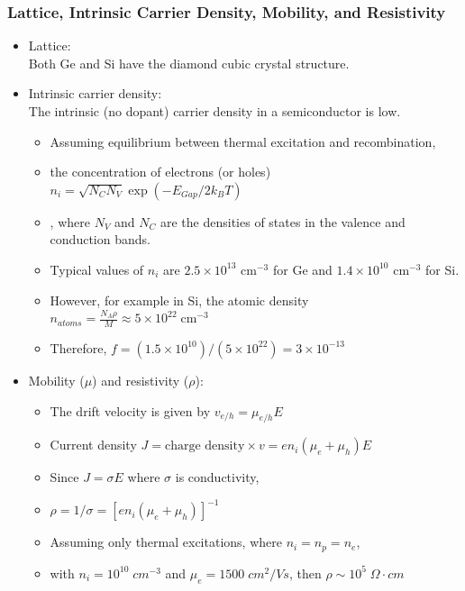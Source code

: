 \subsubsection{Lattice, Intrinsic Carrier Density,  Mobility, and Resistivity}
\begin{itemize}
    \item Lattice:\\
    Both Ge and Si have the diamond cubic crystal structure.
    \item Intrinsic carrier density:\\
    The intrinsic (no dopant) carrier density in a semiconductor is low.
    \begin{itemize}
        \item[] Assuming equilibrium between thermal excitation and recombination, 
        \item[] the concentration of electrons (or holes) $n_i=\sqrt{N_CN_V}\exp(-E_{Gap}/2k_BT)$
        \item[] , where $N_V$ and $N_C$ are the densities of states in the valence and conduction bands.
        \item[] Typical values of $n_i$ are $2.5\times10^{13}$ cm$^{-3}$ for Ge and $1.4\times10^{10}$ cm$^{-3}$ for Si.
        \item[] However, for example in Si, the atomic density $n_{atoms}=\frac{N_A\rho}{M}\approx5\times10^{22}\;\text{cm}^{-3}$
        \item[] Therefore, $f=(1.5\times10^{10})/(5\times10^{22})=3\times10^{-13}$ 
    \end{itemize}
    \item Mobility ($\mu$) and resistivity ($\rho$):
    \begin{itemize}
        \item[] The drift velocity is given by $v_{e/h}=\mu_{e/h}E$
        \item[] Current density $J=\text{charge density}\times v=en_i(\mu_e+\mu_h)E$
        \item[] Since $J=\sigma E$ where $\sigma$ is conductivity,
        \item[] $\rho=1/\sigma=[en_i(\mu_e+\mu_h)]^{-1}$
        \item[] Assuming only thermal excitations, where $n_i=n_p=n_e$, 
        \item[] with $n_i=10^{10}\;cm^{-3}$ and $\mu_e=1500\;cm^2/Vs$, then $\rho\sim10^5\;\Omega\cdot cm$
    \end{itemize}
\end{itemize}
